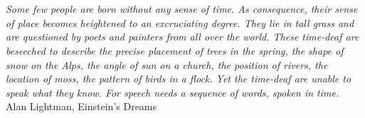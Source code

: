 
\chapter*{}
\vspace{15cm}
\begin{flushright}
	\textit
	{
	Some few people are born without any sense of time. As consequence, their sense of place becomes heightened to an excruciating degree. They lie in tall grass and are questioned by poets and painters from all over the world. These time-deaf are beseeched to describe the precise placement of trees in the spring, the shape of snow on the Alps, the angle of sun on a church, the position of rivers, the location of moss, the pattern of birds in a flock. Yet the time-deaf are unable to speak what they know. For speech needs a sequence of words, spoken in time.
	}\medskip\\ 
	Alan Lightman, Einstein's Dreams
\end{flushright}
